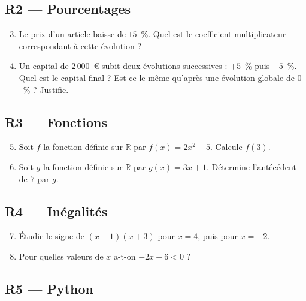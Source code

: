 \subsection*{R2 — Pourcentages}

\begin{enumerate}
  \setcounter{enumi}{2}

  \item Le prix d'un article baisse de $15$~\%. Quel est le coefficient multiplicateur correspondant à cette évolution ?

  \item Un capital de $2\,000$~€ subit deux évolutions successives : $+5$~\% puis $-5$~\%. Quel est le capital final ? Est-ce le même qu'après une évolution globale de $0$~\% ? Justifie.

\end{enumerate}

\subsection*{R3 — Fonctions}

\begin{enumerate}
  \setcounter{enumi}{4}

  \item Soit $f$ la fonction définie sur $\mathbb{R}$ par $f(x) = 2x^2 - 5$. Calcule $f(3)$.

  \item Soit $g$ la fonction définie sur $\mathbb{R}$ par $g(x) = 3x + 1$. Détermine l'antécédent de $7$ par $g$.

\end{enumerate}

\subsection*{R4 — Inégalités}

\begin{enumerate}
  \setcounter{enumi}{6}

  \item Étudie le signe de $(x - 1)(x + 3)$ pour $x = 4$, puis pour $x = -2$.

  \item Pour quelles valeurs de $x$ a-t-on $-2x + 6 < 0$ ?

\end{enumerate}

\subsection*{R5 — Python}

